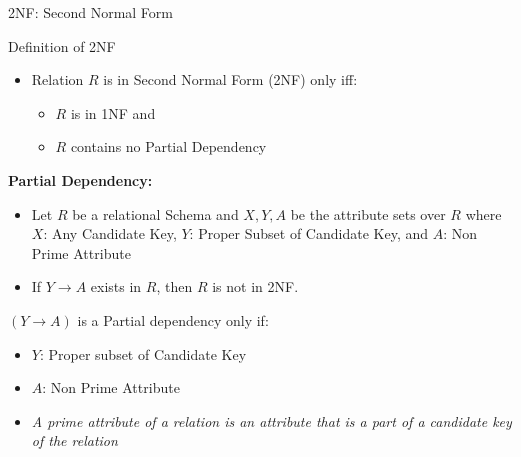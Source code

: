 \documentclass[aspectratio=169, xcolor=dvipsnames]{beamer}
\begin{document}
\begin{frame}{2NF: Second Normal Form}
    \begin{block}{Definition of 2NF}
        \begin{itemize}[<+->]
            \item Relation $R$ is in Second Normal Form (2NF) only iff:
            \begin{itemize}
                \item[$\triangleright$] $R$ is in 1NF and
                \item[$\triangleright$] $R$ contains no Partial Dependency
            \end{itemize}
        \end{itemize}
    \end{block}
    \vspace{0.5em}
    \textbf{Partial Dependency:}
    \begin{itemize}[<+(2)->]
        \item Let $R$ be a relational Schema and $X, Y, A$ be the attribute sets over $R$ where $X$: Any Candidate Key, $Y$: Proper Subset of Candidate Key, and $A$: Non Prime Attribute
        \item If $Y \rightarrow A$ exists in $R$, then $R$ is not in 2NF.
    \end{itemize}
    $(Y \rightarrow A)$ is a Partial dependency only if:
    \begin{itemize}[<+(4)->]
        \item $Y$: Proper subset of Candidate Key
        \item $A$: Non Prime Attribute
        \item \textit{A prime attribute of a relation is an attribute that is a part of a candidate key of the relation}
    \end{itemize}
\end{frame}
\end{document}
